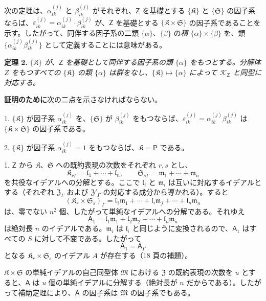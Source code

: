 次の定理は、\(\alpha_{ik}^{(j)}\) と \(\beta_{ik}^{(j)}\) がそれぞれ、\(\mathsf{Z}\) を基礎とする \(\{\mathfrak K\}\) と \(\{\mathfrak S\}\) の因子系ならば、\(\varepsilon_{ik}^{(j)}=\alpha_{ik}^{(j)}\cdot\beta_{ik}^{(j)}\) が、\(\mathsf{Z}\) を基礎とする \(\{\mathfrak K\times\mathfrak S\}\) の因子系であることを示す。したがって、同伴する因子系の二類 \(\{\alpha\}\)、\(\{\beta\}\) の\emph{積 \(\{\alpha\}\times\{\beta\}\)} を、類 \(\{\alpha_{ik}^{(j)}\beta_{ik}^{(j)}\}\) として定義することには意味がある。

\textbf{定理 2.} \emph{\(\{\mathfrak K\}\) が、\(\mathsf{Z}\) を基礎として同伴する因子系の類 \(\{\alpha\}\) をもつとする。分解体 \(Z\) をもつすべての \(\{\mathfrak K\}\) の類 \(\{\alpha\}\) は群をなし、\(\{\mathfrak K\}\mapsto\{\alpha\}\) によって \(\mathscr K_{\mathsf{Z}}\) と同型に対応する。}

\textbf{証明のために}次の二点を示さなければならない。

1. \(\{\mathfrak K\}\) が因子系 \(\alpha_{ik}^{(j)}\) を、\(\{\mathfrak S\}\) が \(\beta_{ik}^{(j)}\) をもつならば、\(\varepsilon_{ik}^{(j)}=\alpha_{ik}^{(j)}\beta_{ik}^{(j)}\) は \(\{\mathfrak K\times\mathfrak S\}\) の因子系である。

2. \(\{\mathfrak K\}\) が因子系 \(\alpha_{ik}^{(j)}=1\) をもつならば、\(\mathfrak K=\mathsf P\) である。

1. \(\mathsf{Z}\) から \(\mathfrak K\)、\(\mathfrak S\) への既約表現の次数をそれぞれ \(r,s\) とし、
\[
\mathfrak K_{r\Gamma}=\mathfrak l_1+\cdots+\mathfrak l_n,\qquad
\mathfrak S_{s\Gamma}=\mathfrak m_1+\cdots+\mathfrak m_n
\]
を共役なイデアルへの分解とする。ここで \(\mathfrak l_i\) と \(\mathfrak m_i\) は互いに対応するイデアルとする（それぞれ \(\mathfrak Z_\Gamma\) および \(\mathfrak Z'_\Gamma\) の対応する成分から導かれる）。すると
\[
(\mathfrak K_r\times\mathfrak S_s)_\Gamma
=\mathfrak l_1\mathfrak m_1+\cdots+\mathfrak l_i\mathfrak m_j+\cdots+\mathfrak l_n\mathfrak m_n
\]
は、零でない \(n^2\) 個、したがって単純なイデアルへの分解である。それゆえ
\[
\mathsf{A}_1=\mathfrak l_1\mathfrak m_1+\mathfrak l_2\mathfrak m_2+\cdots+\mathfrak l_n\mathfrak m_n
\]
は絶対長 \(n\) のイデアルである。\(\mathfrak m_i\) は \(\mathfrak l_i\) と同じように変換されるので、\(\mathsf{A}_1\) はすべての \(S\) に対して不変である。したがって
\[
\mathsf{A}_1=\mathsf{A}_\Gamma
\]
となる \(\mathfrak K_r\times\mathfrak S_s\) のイデアル \(A\) が存在する（18 頁の補題）。

\(\mathfrak K\times\mathfrak S\) の単純イデアルの自己同型体 \(\mathfrak M\) における \(\mathfrak Z\) の既約表現の次数を \(u\) とすると、\(\mathsf{A}\) は \(u\) 個の単純イデアルに分解する（絶対長が \(n\) だからである）。したがって補助定理により、\(\mathsf{A}\) の因子系は \(\mathfrak M\) の因子系でもある。

